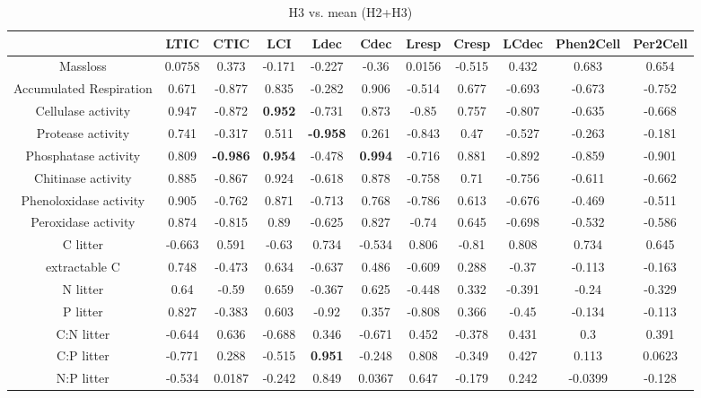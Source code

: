 \documentclass[authoryear,preprint,review,12pt]{elsarticle}
\begin{document}
\begin{table}[h!]
\begin{center}
\caption{H3 vs. mean (H2+H3)}
\label{morecorr3}
{\tiny
\begin{tabular}{ccccccccccc}
  \hline
 & LTIC & CTIC & LCI & Ldec & Cdec & Lresp & Cresp & LCdec & Phen2Cell & Per2Cell \\ 
  \hline
Massloss & 0.0758 & 0.373 & -0.171 & -0.227 & -0.36 & 0.0156 & -0.515 & 0.432 & 0.683 & 0.654 \\ 
  Accumulated Respiration & 0.671 & -0.877 & 0.835 & -0.282 & 0.906 & -0.514 & 0.677 & -0.693 & -0.673 & -0.752 \\ 
  Cellulase activity & 0.947 & -0.872 & \textbf{ 0.952 } & -0.731 & 0.873 & -0.85 & 0.757 & -0.807 & -0.635 & -0.668 \\ 
  Protease activity & 0.741 & -0.317 & 0.511 & \textbf{ -0.958 } & 0.261 & -0.843 & 0.47 & -0.527 & -0.263 & -0.181 \\ 
  Phosphatase activity & 0.809 & \textbf{ -0.986 } & \textbf{ 0.954 } & -0.478 & \textbf{ 0.994 } & -0.716 & 0.881 & -0.892 & -0.859 & -0.901 \\ 
  Chitinase activity & 0.885 & -0.867 & 0.924 & -0.618 & 0.878 & -0.758 & 0.71 & -0.756 & -0.611 & -0.662 \\ 
  Phenoloxidase activity & 0.905 & -0.762 & 0.871 & -0.713 & 0.768 & -0.786 & 0.613 & -0.676 & -0.469 & -0.511 \\ 
  Peroxidase activity & 0.874 & -0.815 & 0.89 & -0.625 & 0.827 & -0.74 & 0.645 & -0.698 & -0.532 & -0.586 \\ 
  C litter & -0.663 & 0.591 & -0.63 & 0.734 & -0.534 & 0.806 & -0.81 & 0.808 & 0.734 & 0.645 \\ 
  extractable C & 0.748 & -0.473 & 0.634 & -0.637 & 0.486 & -0.609 & 0.288 & -0.37 & -0.113 & -0.163 \\ 
  N litter & 0.64 & -0.59 & 0.659 & -0.367 & 0.625 & -0.448 & 0.332 & -0.391 & -0.24 & -0.329 \\ 
  P litter & 0.827 & -0.383 & 0.603 & -0.92 & 0.357 & -0.808 & 0.366 & -0.45 & -0.134 & -0.113 \\ 
  C:N litter & -0.644 & 0.636 & -0.688 & 0.346 & -0.671 & 0.452 & -0.378 & 0.431 &  0.3 & 0.391 \\ 
  C:P litter & -0.771 & 0.288 & -0.515 & \textbf{ 0.951 } & -0.248 & 0.808 & -0.349 & 0.427 & 0.113 & 0.0623 \\ 
  N:P litter & -0.534 & 0.0187 & -0.242 & 0.849 & 0.0367 & 0.647 & -0.179 & 0.242 & -0.0399 & -0.128 \\ 

\end{tabular}}
\end{center}
\end{table}
\end{document}
